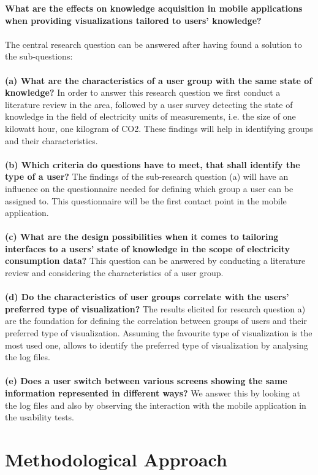 \textbf{What are the effects on knowledge acquisition in mobile applications when providing visualizations tailored to users' knowledge?}
\\\\
The central research question can be answered after having found a solution to the sub-questions:\\\\
\textbf{(a) What are the characteristics of a user group with the same state of knowledge?}
In order to answer this research question we first conduct a literature review in the area, followed by a user survey detecting the state of knowledge in the field of electricity units of measurements, i.e. the size of one kilowatt hour, one kilogram of CO2. These findings will help in identifying groups and their characteristics.\\\\
\textbf{(b) Which criteria do questions have to meet, that shall identify the type of a user?}
The findings of the sub-research question (a) will have an influence on the questionnaire needed for defining which group a user can be assigned to. This questionnaire will be the first contact point in the mobile application.
\\\\
\textbf{(c) What are the design possibilities when it comes to tailoring interfaces to a users' state of knowledge in the scope of electricity consumption data?}
This question can be answered by conducting a literature review and considering the characteristics of a user group.
\\\\
\textbf{(d) Do the characteristics of user groups correlate with the users' preferred type of visualization?}
The results elicited for research question a) are the foundation for defining the correlation between groups of users and their preferred type of visualization. Assuming the favourite type of visualization is the most used one, allows to identify the preferred type of visualization by analysing the log files.
\\\\
\textbf{(e) Does a user switch between various screens showing the same information represented in different ways?}
We answer this by looking at the log files and also by observing the interaction with the mobile application in the usability tests.

\section{Methodological Approach}

